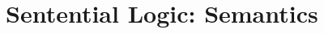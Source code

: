 \documentclass[../logic-text.tex]{subfiles}
\begin{document}
\chapter{Sentential Logic: Semantics}
\label{cha:sent-logic:-semant}
\end{document}

